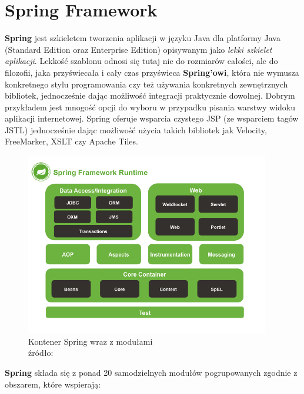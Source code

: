 \section{Spring Framework}
	\textbf{Spring} jest szkieletem tworzenia aplikacji w języku Java dla platformy Java (Standard Edition oraz Enterprise Edition) opisywanym jako \textit{lekki szkielet aplikacji}. Lekkość szablonu odnosi się tutaj nie do rozmiarów całości, ale do filozofii, jaka przyświecała i cały czas przyświeca \textbf{Spring'owi}, która nie wymusza konkretnego stylu programowania czy też używania konkretnych zewnętrznych bibliotek, jednocześnie dając możliwość integracji praktycznie dowolnej. Dobrym przykładem jest mnogość opcji do wyboru w przypadku pisania warstwy widoku aplikacji internetowej. Spring oferuje wsparcia czystego JSP (ze wsparciem tagów JSTL) jednocześnie dając możliwość użycia takich bibliotek jak Velocity, FreeMarker, XSLT czy Apache Tiles.
	\begin{figure}[h]
		\centering
		\includegraphics[width=0.95\textwidth]{images/spring-overview}
		\caption[Kontener Spring]{
			Kontener Spring wraz z modułami\\ 
			źródło: \cite{spring_documentation_reference}
		}
		\label{c3:information_level_figure}
	\end{figure}	
	 \textbf{Spring} składa się z ponad 20 samodzielnych modułów pogrupowanych zgodnie z obszarem, które wspierają:
